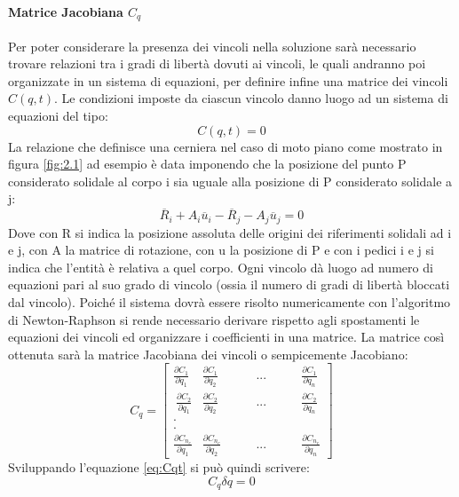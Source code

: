 \paragraph{Matrice Jacobiana $C_q$} Per poter considerare la presenza dei vincoli nella soluzione sarà necessario trovare relazioni tra i gradi di libertà dovuti ai vincoli, le quali andranno poi organizzate in un sistema di equazioni, per definire infine una matrice dei vincoli $C(q,t)$. \newline Le condizioni imposte da ciascun vincolo danno luogo ad un sistema di equazioni del tipo:
\begin{equation} \label{eq:Cqt}
C(q,t) = 0
\end{equation}
La relazione che definisce una cerniera nel caso di moto piano come mostrato in figura \ref{fig:2.1} ad esempio è data imponendo che la posizione del punto P considerato solidale al corpo i sia uguale alla posizione di P considerato solidale a j:
\[\overline{R}_i + A_i\overline{u}_i -\overline{R}_j - A_j\overline{u}_j = 0\]
Dove con R si indica la posizione assoluta delle origini dei riferimenti solidali ad i e j, con A la matrice di rotazione, con u la posizione di P e con i pedici i e j si indica che l'entità è relativa a quel corpo.
Ogni vincolo dà luogo ad numero di equazioni pari al suo grado di vincolo (ossia il numero di gradi di libertà bloccati dal vincolo). Poiché il sistema dovrà essere risolto numericamente con l'algoritmo di Newton-Raphson si rende necessario derivare rispetto agli spostamenti le equazioni dei vincoli ed organizzare i coefficienti in una matrice. La matrice così ottenuta sarà la matrice Jacobiana dei vincoli o sempicemente Jacobiano:
\begin{equation}
\label{eq:jacobian}
C_q =  \begin{bmatrix}
\frac{\partial C_1}{\partial q_1} & \frac{\partial C_1}{\partial q_2} & \qquad ... \qquad & \frac{\partial C_1}{\partial q_n} \\\
\frac{\partial C_2}{\partial q_1} & \frac{\partial C_2}{\partial q_2} & \qquad ... \qquad & \frac{\partial C_2}{\partial q_n} \\ . \\. \\ 
\frac{\partial C_{n_c}}{\partial q_1} & \frac{\partial C_{n_c}}{\partial q_2} & \qquad ... \qquad & \frac{\partial C_{n_c}}{\partial q_n}
\end{bmatrix} 
\end{equation}
Sviluppando l'equazione \ref{eq:Cqt} si può quindi scrivere:
\begin{equation} \label{jacobian_expansion}
C_q \delta q = 0
\end{equation}
